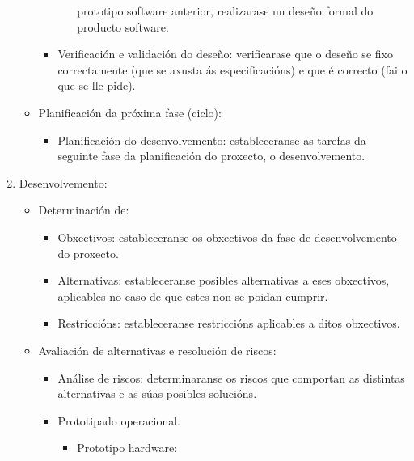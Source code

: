 \begin{enumerate}
\begin{itemize}
\begin{itemize}
\begin{itemize}
                            prototipo software anterior, realizarase un deseño
                            formal do producto software.
                     \end{itemize}
               \item Verificación e validación do deseño: verificarase que o
                     deseño se fixo correctamente (que se axusta ás
                     especificacións) e que é correcto (fai o que se lle pide).
              \end{itemize}
        \item Planificación da próxima fase (ciclo):
              \begin{itemize}
               \item Planificación do desenvolvemento: estableceranse as
                     tarefas da seguinte fase da planificación do proxecto, o
                     desenvolvemento.
              \end{itemize}
       \end{itemize}
 \item Desenvolvemento:
       \begin{itemize}
        \item Determinación de:
              \begin{itemize}
               \item Obxectivos: estableceranse os obxectivos da fase de
                     desenvolvemento do proxecto.
               \item Alternativas: estableceranse posibles alternativas a eses
                     obxectivos, aplicables no caso de que estes non se poidan
                     cumprir.
               \item Restriccións: estableceranse restriccións aplicables a
                     ditos obxectivos.
              \end{itemize}
        \item Avaliación de alternativas e resolución de riscos:
              \begin{itemize}
               \item Análise de riscos: determinaranse os riscos que comportan
                     as distintas alternativas e as súas posibles solucións.
               \item Prototipado operacional.
                     \begin{itemize}
                      \item Prototipo hardware:
                            \begin{itemize}

\end{itemize}
\end{itemize}
\end{itemize}
\end{itemize}
\end{enumerate}
